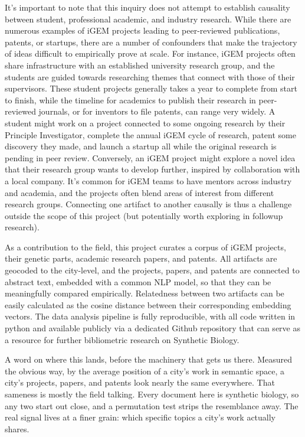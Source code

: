 \documentclass[12pt,a4paper]{article}
\begin{document}
	It's important to note that this inquiry does not attempt to establish causality between student, professional academic, and industry research. While there are numerous examples of iGEM projects leading to peer-reviewed publications, patents, or startups, there are a number of confounders that make the trajectory of ideas difficult to empirically prove at scale. For instance, iGEM projects often share infrastructure with an established university research group, and the students are guided towards researching themes that connect with those of their supervisors. These student projects generally takes a year to complete from start to finish, while the timeline for academics to publish their research in peer-reviewed journals, or for inventors to file patents, can range very widely. A student might work on a project connected to some ongoing research by their Principle Investigator, complete the annual iGEM cycle of research, patent some discovery they made, and launch a startup all while the original research is pending in peer review. Conversely, an iGEM project might explore a novel  idea that their research group wants to develop further, inspired by collaboration with a local company. It's common for iGEM teams to have mentors across industry and academia, and the projects often blend areas of interest from different research groups. Connecting one artifact to another causally is thus a challenge outside the scope of this project (but potentially worth exploring in followup research).
	
	As a contribution to the field, this project curates a corpus of iGEM projects, their genetic parts, academic research papers, and patents. All artifacts are geocoded to the city-level, and the projects, papers, and patents are connected to abstract text, embedded with a common NLP model, so that they can be meaningfully compared empirically. Relatedness between two artifacts can be easily calculated as the cosine distance between their corresponding embedding vectors. The data analysis pipeline is fully reproducible, with all code written in python and available publicly via a dedicated Github repository that can serve as a resource for further bibliometric research on Synthetic Biology.

	A word on where this lands, before the machinery that gets us there. Measured the obvious way, by the average position of a city's work in semantic space, a city's projects, papers, and patents look nearly the same everywhere. That sameness is mostly the field talking. Every document here is synthetic biology, so any two start out close, and a permutation test strips the resemblance away. The real signal lives at a finer grain: which specific topics a city's work actually shares.
\end{document}
